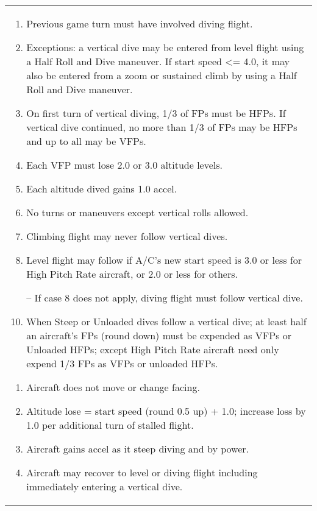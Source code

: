 \begin{twocolumntablefloat}
\begin{twocolumntable}
\begin{tabularx}{\linewidth}{P}
\begin{multicols}{2}

\begin{enumerate}[nosep]
    \item Previous game turn must have involved diving flight.
    \item Exceptions: a vertical dive may be entered from level flight using a Half Roll and Dive maneuver. If start speed <= 4.0, it may also be entered from a zoom or sustained climb by using a Half Roll and Dive maneuver.
    \item On first turn of vertical diving, 1/3 of FPs must be HFPs. If vertical dive continued, no more than 1/3 of FPs may be HFPs and up to all may be VFPs.
    \item Each VFP must lose 2.0 or 3.0 altitude levels.
    \item Each altitude dived gains 1.0 accel.
    \item No turns or maneuvers except vertical rolls allowed.
    \item Climbing flight may never follow vertical dives.
    \item Level flight may follow if A/C's new start speed is 3.0 or less for High Pitch Rate aircraft, or 2.0 or less for others.
    \item[--] If case 8 does not apply, diving flight must follow vertical dive.
    \item When Steep or Unloaded dives follow a vertical dive; at least half an aircraft's FPs (round down) must be expended as VFPs or Unloaded HFPs; except High Pitch Rate aircraft need only expend 1/3 FPs as VFPs or unloaded HFPs.
\end{enumerate}


\begin{enumerate}[nosep]
    \item Aircraft does not move or change facing.
    \item Altitude lose = start speed (round 0.5 up) + 1.0; increase loss by 1.0 per additional turn of stalled flight.
    \item Aircraft gains accel as it steep diving and by power.
    \item Aircraft may recover to level or diving flight including immediately entering a vertical dive.
\end{enumerate}



\end{multicols}
\end{tabularx}
\end{twocolumntable}
\end{twocolumntablefloat}
